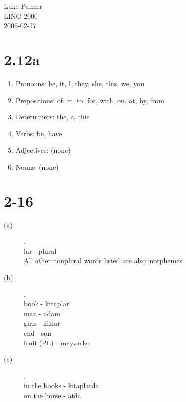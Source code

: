\documentclass[12pt]{article}
\begin{document}
\noindent
Luke Palmer \\
LING 2000 \\
2006-02-17

\section*{2.12a}
\begin{enumerate}
\item Pronouns: he, it, I, they, she, this, we, you
\item Prepositions: of, in, to, for, with, on, at, by, from
\item Determiners: the, a, this
\item Verbs: be, have
\item Adjectives: (none)
\item Nouns: (none)
\end{enumerate}

\section*{2-16}
\begin{description}
\item[(a)]. \\ 
  lar - plural \\ 
  All other nonplural words listed are also morphemes
\item[(b)]. \\
  book - kitaplar \\
  man - adam \\
  girls - kizlar \\
  end - son \\
  fruit (PL) - mayvarlar
\item[(c)]. \\
  in the books - kitaplarda \\
  on the horse - atda
\end{description}
\end{document}
